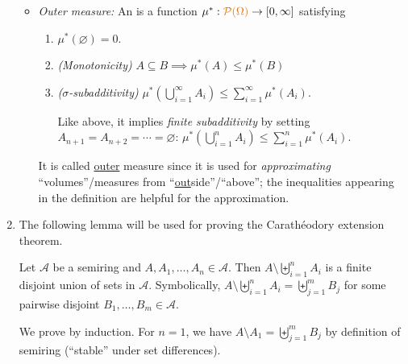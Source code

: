\begin{enumerate}
\begin{itemize}
\item \emph{Outer measure:} An  is a function
\(\mu^*:\orc{\mathcal{P}(\Omega)}\to[0,\infty]\) satisfying
\begin{enumerate}[label={(\arabic*)}]
\item \(\mu^*(\varnothing)=0\).
\item \emph{(Monotonicity)} \(A\subseteq B\implies \mu^*(A)\le\mu^*(B)\)
\item \emph{(\(\sigma\)-subadditivity)} \(\mu^*(\bigcup_{i=1}^{\infty}A_i)\le\sum_{i=1}^{\infty}\mu^*(A_i)\).
\begin{note}
Like above, it implies \emph{finite subadditivity} by setting
\(A_{n+1}=A_{n+2}=\dotsb=\varnothing\):
\(\mu^*(\bigcup_{i=1}^{n}A_i)\le\sum_{i=1}^{n}\mu^*(A_i)\).
\end{note}
\end{enumerate}
It is called \underline{outer} measure since it is used for
\emph{approximating} ``volumes''/measures from
``\underline{out}side''/``above''; the inequalities appearing in the definition
are helpful for the approximation.
\end{itemize}
\item The following lemma will be used for proving the Carath\'eodory extension
theorem.
\begin{lemma}
\label{lma:diff-mult-sets}
Let \(\mathcal{A}\) be a semiring and \(A,A_1,\dotsc,A_n\in\mathcal{A}\). Then
\(A\setminus\biguplus_{i=1}^{n}A_i\) is a finite disjoint union of sets in
\(\mathcal{A}\). Symbolically, \(A\setminus\biguplus_{i=1}^{n}A_i
=\biguplus_{j=1}^{m}B_j\) for some
pairwise disjoint \(B_1,\dotsc,B_m\in\mathcal{A}\).
\end{lemma}
\begin{pf}
We prove by induction. For \(n=1\), we have \(A\setminus
A_1=\biguplus_{j=1}^{m}B_j\) by definition of semiring (``stable'' under set differences).


\end{pf}
\end{enumerate}
